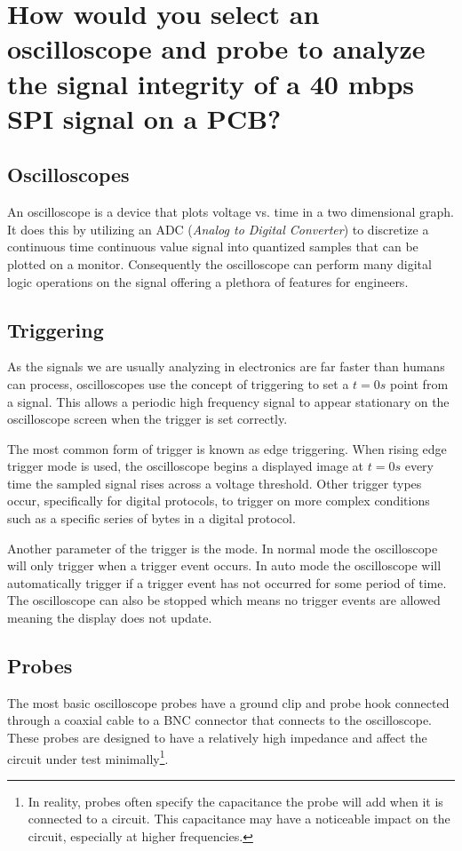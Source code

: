 \documentclass[main.tex]{subfiles}
\begin{document}
\section{How would you select an oscilloscope and probe to analyze the signal integrity of a 40 mbps SPI signal on a PCB?}

\spoilerline

\subsection{Oscilloscopes}
An oscilloscope is a device that plots voltage vs. time in a two dimensional graph. It does this by utilizing an ADC (\textit{Analog to Digital Converter}) to discretize a continuous time continuous value signal into quantized samples that can be plotted on a monitor. Consequently the oscilloscope can perform many digital logic operations on the signal offering a plethora of features for engineers. 

\subsection{Triggering}
As the signals we are usually analyzing in electronics are far faster than humans can process, oscilloscopes use the concept of triggering to set a $t=0s$ point from a signal. This allows a periodic high frequency signal to appear stationary on the oscilloscope screen when the trigger is set correctly. 

The most common form of trigger is known as edge triggering. When rising edge trigger mode is used, the oscilloscope begins a displayed image at $t=0s$ every time the sampled signal rises across a voltage threshold. Other trigger types occur, specifically for digital protocols, to trigger on more complex conditions such as a specific series of bytes in a digital protocol. 

Another parameter of the trigger is the mode. In normal mode the oscilloscope will only trigger when a trigger event occurs. In auto mode the oscilloscope will automatically trigger if a trigger event has not occurred for some period of time. The oscilloscope can also be stopped which means no trigger events are allowed meaning the display does not update.  

\subsection{Probes}
The most basic oscilloscope probes have a ground clip and probe hook connected through a coaxial cable to a BNC connector that connects to the oscilloscope. These probes are designed to have a relatively high impedance and affect the circuit under test minimally\footnote{In reality, probes often specify the capacitance the probe will add when it is connected to a circuit. This capacitance may have a noticeable impact on the circuit, especially at higher frequencies.}.
\end{document}
